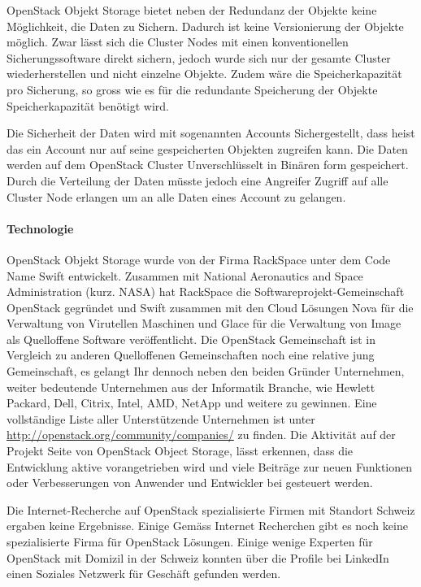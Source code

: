 OpenStack Objekt Storage bietet neben der Redundanz der Objekte keine Möglichkeit, die Daten zu Sichern. Dadurch ist keine Versionierung der Objekte möglich. Zwar lässt sich die Cluster Nodes mit einen konventionellen Sicherungssoftware direkt sichern, jedoch wurde sich nur der gesamte Cluster wiederherstellen und nicht einzelne Objekte. Zudem wäre die Speicherkapazität pro Sicherung, so gross wie es für die redundante Speicherung der Objekte Speicherkapazität benötigt wird. \cite{AndyBrezinsky2011}


Die Sicherheit der Daten wird mit sogenannten Accounts Sichergestellt, dass heist das ein Account nur auf seine gespeicherten Objekten zugreifen kann. Die Daten werden auf dem OpenStack Cluster Unverschlüsselt in Binären form gespeichert. Durch die Verteilung der Daten müsste jedoch eine Angreifer Zugriff auf alle Cluster Node erlangen um an alle Daten eines Account zu gelangen.

\paragraph*{Technologie}
OpenStack Objekt Storage wurde von der Firma RackSpace unter dem Code Name Swift entwickelt. Zusammen mit National Aeronautics and Space Administration (kurz. NASA) hat RackSpace die Softwareprojekt-Gemeinschaft OpenStack gegründet und Swift zusammen mit den Cloud Lösungen Nova für die Verwaltung von Virutellen Maschinen und Glace für die Verwaltung von Image als Quelloffene Software veröffentlicht. Die OpenStack Gemeinschaft ist in Vergleich zu anderen Quelloffenen Gemeinschaften noch eine relative jung Gemeinschaft, es gelangt Ihr dennoch neben den beiden Gründer Unternehmen, weiter bedeutende Unternehmen aus der Informatik Branche, wie Hewlett Packard, Dell, Citrix, Intel, AMD, NetApp und weitere zu gewinnen. Eine vollständige Liste aller Unterstützende Unternehmen ist unter \url{http://openstack.org/community/companies/} zu finden. Die Aktivität auf der Projekt Seite von OpenStack Object Storage, lässt erkennen, dass die Entwicklung aktive vorangetrieben wird und viele Beiträge zur neuen Funktionen oder Verbesserungen von Anwender und Entwickler bei gesteuert werden. \cite{Ohloh2012}

Die Internet-Recherche auf OpenStack spezialisierte Firmen mit Standort Schweiz ergaben keine Ergebnisse. Einige
Gemäss Internet Recherchen gibt es noch keine spezialisierte Firma für OpenStack Lösungen. Einige wenige Experten für OpenStack mit Domizil in der Schweiz konnten über die Profile bei LinkedIn einen Soziales Netzwerk für Geschäft gefunden werden. 

